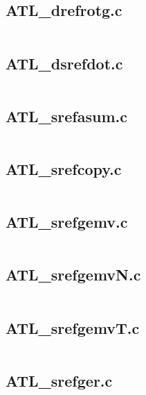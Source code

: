 \documentclass{article}
\begin{document}
\subsection{ATL\_drefrotg.c}
\inputminted{c}{/home/dufferzafar/dev/@clones/scikit-learn/sklearn/src/cblas/ATL_drefrotg.c}
\newpage

\subsection{ATL\_dsrefdot.c}
\inputminted{c}{/home/dufferzafar/dev/@clones/scikit-learn/sklearn/src/cblas/ATL_dsrefdot.c}
\newpage

\subsection{ATL\_srefasum.c}
\inputminted{c}{/home/dufferzafar/dev/@clones/scikit-learn/sklearn/src/cblas/ATL_srefasum.c}
\newpage

\subsection{ATL\_srefcopy.c}
\inputminted{c}{/home/dufferzafar/dev/@clones/scikit-learn/sklearn/src/cblas/ATL_srefcopy.c}
\newpage

\subsection{ATL\_srefgemv.c}
\inputminted{c}{/home/dufferzafar/dev/@clones/scikit-learn/sklearn/src/cblas/ATL_srefgemv.c}
\newpage

\subsection{ATL\_srefgemvN.c}
\inputminted{c}{/home/dufferzafar/dev/@clones/scikit-learn/sklearn/src/cblas/ATL_srefgemvN.c}
\newpage

\subsection{ATL\_srefgemvT.c}
\inputminted{c}{/home/dufferzafar/dev/@clones/scikit-learn/sklearn/src/cblas/ATL_srefgemvT.c}
\newpage

\subsection{ATL\_srefger.c}
\inputminted{c}{/home/dufferzafar/dev/@clones/scikit-learn/sklearn/src/cblas/ATL_srefger.c}
\newpage
\end{document}
